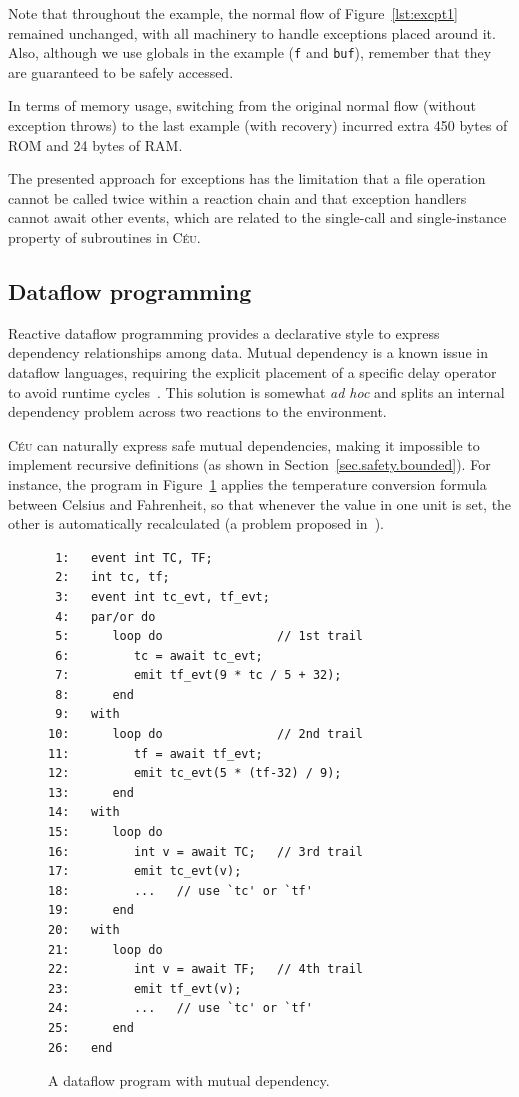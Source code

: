 \documentclass[preprint]{sigplanconf}
\newcommand{\CEU}{\textsc{C\'{e}u}\xspace}
\newcommand{\code}[1] {{\small{\texttt{#1}}}}
\newcommand{\1}{\;}
\newcommand{\2}{\;\;}
\newcommand{\3}{\;\;\;}
\newcommand{\5}{\;\;\;\;\;}
\begin{document}
Note that throughout the example, the normal flow of Figure~\ref{lst:excpt1} 
remained unchanged, with all machinery to handle exceptions placed around it.
Also, although we use globals in the example (\code{f} and \code{buf}), 
remember that they are guaranteed to be safely accessed.

In terms of memory usage, switching from the original normal flow (without 
exception throws) to the last example (with recovery) incurred extra 450 bytes 
of ROM and 24 bytes of RAM.

The presented approach for exceptions has the limitation that a file operation 
cannot be called twice within a reaction chain and that exception handlers 
cannot await other events, which are related to the single-call and 
single-instance property of subroutines in \CEU.

\subsection{Dataflow programming}
\label{sec.adv.frp}

Reactive dataflow programming \cite{frp.survey} provides a declarative style to 
express dependency relationships among data.
Mutual dependency is a known issue in dataflow languages, requiring the 
explicit placement of a specific delay operator to avoid runtime
cycles~\cite{frtime.embedding,luagravity.sblp}.
This solution is somewhat \emph{ad hoc} and splits an internal dependency 
problem across two reactions to the environment.

\CEU can naturally express safe mutual dependencies, making it impossible to 
implement recursive definitions (as shown in Section~\ref{sec.safety.bounded}).
For instance, the program in Figure~\ref{lst:ceu:frp:2} applies the temperature 
conversion formula between Celsius and Fahrenheit, so that whenever the value 
in one unit is set, the other is automatically recalculated (a problem proposed 
in~\cite{frp.survey}).

\begin{figure}[t]
{\small
\begin{verbatim}
 1:   event int TC, TF;
 2:   int tc, tf;
 3:   event int tc_evt, tf_evt;
 4:   par/or do
 5:      loop do                // 1st trail
 6:         tc = await tc_evt;
 7:         emit tf_evt(9 * tc / 5 + 32);
 8:      end
 9:   with
10:      loop do                // 2nd trail
11:         tf = await tf_evt;
12:         emit tc_evt(5 * (tf-32) / 9);
13:      end
14:   with
15:      loop do
16:         int v = await TC;   // 3rd trail
17:         emit tc_evt(v);
18:         ...   // use `tc' or `tf'
19:      end
20:   with
21:      loop do
22:         int v = await TF;   // 4th trail
23:         emit tf_evt(v);
24:         ...   // use `tc' or `tf'
25:      end
26:   end
\end{verbatim}
}%
\caption{ A dataflow program with mutual dependency.
\label{lst:ceu:frp:2}
}
\end{figure}
\end{document}
